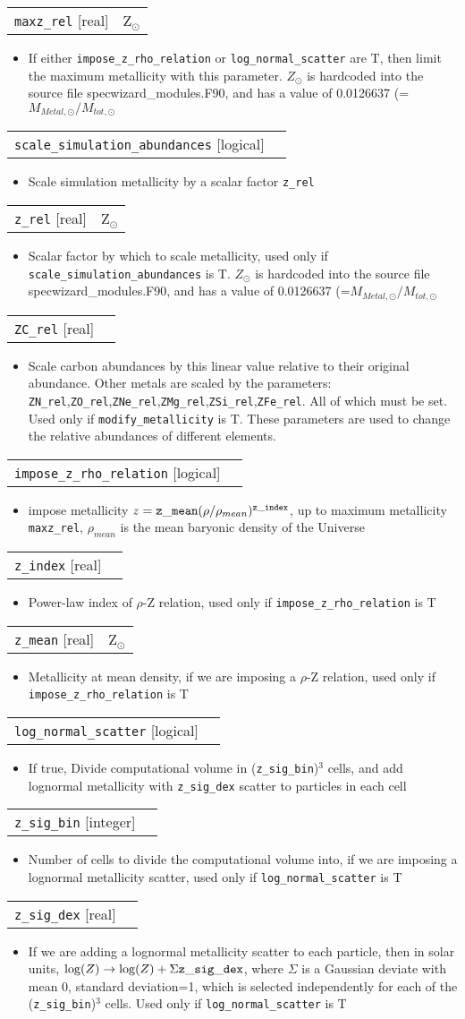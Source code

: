 \documentclass{report}
\makeatletter
\newcommand{\paramdefinition}[3]{
\begin{tabular*}{\textwidth}{l@{\extracolsep{\fill}}r}
		{\tt #1} [{\sc #2}]& #3 \\
\end{tabular*}}
\newcommand{\paramdescription}[1]{
\begin{itemize}
\item #1
\end{itemize}\vspace{0.2cm}}
\newcommand{\param}[1]{{\tt #1}}
\makeatother
\begin{document}
\paramdefinition{maxz\_rel}{real}{Z$_{\odot}$}
\paramdescription{If either {\tt impose\_z\_rho\_relation} or {\tt log\_normal\_scatter} are T, then limit the maximum metallicity with this parameter.  $Z_{\odot}$ is hardcoded into the source file specwizard\_modules.F90, and has a value of 0.0126637  (=$M_{Metal,\odot}/M_{tot,\odot}$}

\paramdefinition{scale\_simulation\_abundances}{logical}{ }
\paramdescription{Scale simulation metallicity by a scalar factor \param{z\_rel}}

\paramdefinition{z\_rel}{real}{Z$_{\odot}$}
\paramdescription{Scalar factor by which to scale metallicity, used only if {\tt scale\_simulation\_abundances} is T.   $Z_{\odot}$ is hardcoded into the source file specwizard\_modules.F90, and has a value of 0.0126637  (=$M_{Metal,\odot}/M_{tot,\odot}$}

\paramdefinition{ZC\_rel}{real}{}
\paramdescription{Scale carbon abundances by this linear value relative to their original abundance.  Other metals are scaled by the parameters: {\tt ZN\_rel},{\tt ZO\_rel},{\tt ZNe\_rel},{\tt ZMg\_rel},{\tt ZSi\_rel},{\tt ZFe\_rel}.  All of which must be set.  Used only if {\tt modify\_metallicity} is T.  These parameters are used to change the relative abundances of different elements.}

\paramdefinition{impose\_z\_rho\_relation}{logical}{ }
\paramdescription{ impose metallicity $z = {\tt z\_mean} (\rho/\rho_{mean})^{{\tt z\_index}}$, up to maximum metallicity {\tt maxz\_rel}, $\rho_{mean}$ is the mean baryonic density of the Universe}

\paramdefinition{z\_index}{real}{ }
\paramdescription{Power-law index of $\rho$-Z relation, used only if {\tt impose\_z\_rho\_relation} is T}

\paramdefinition{z\_mean}{real}{Z$_{\odot}$}
\paramdescription{Metallicity at mean density, if we are imposing a $\rho$-Z relation, used only if {\tt impose\_z\_rho\_relation} is T}

\paramdefinition{log\_normal\_scatter}{logical}{ }
\paramdescription{If true, Divide computational volume in ({\tt z\_sig\_bin})$^3$ cells, and add lognormal metallicity with {\tt z\_sig\_dex} scatter to particles in each cell}

\paramdefinition{z\_sig\_bin}{integer}{}
\paramdescription{Number of cells to divide the computational volume into, if we are imposing a lognormal metallicity scatter, used only if {\tt log\_normal\_scatter} is T}

\paramdefinition{z\_sig\_dex}{real}{}
\paramdescription{If we are adding a lognormal metallicity scatter to each particle, then in solar units, $\log(Z) \rightarrow \log(Z)+\Sigma {\tt z\_sig\_dex}$, where $\Sigma$ is a Gaussian deviate with mean 0, standard deviation=1, which is selected independently for each of the ({\tt z\_sig\_bin})$^3$ cells. Used only if {\tt log\_normal\_scatter} is T}
\end{document}
